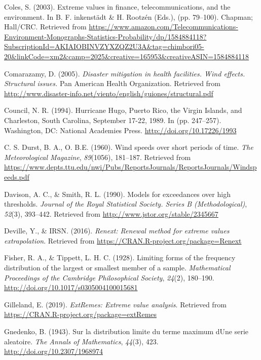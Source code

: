 \documentclass[12pt,oneside]{reedthesis}
\begin{document}
\leavevmode\hypertarget{ref-Coles2003}{}%
Coles, S. (2003). Extreme values in finance, telecommunications, and the environment. In B. F. inkenstädt \& H. Rootzén (Eds.), (pp. 79--100). Chapman; Hall/CRC. Retrieved from \url{https://www.amazon.com/Telecommunications-Environment-Monographs-Statistics-Probability/dp/1584884118?SubscriptionId=AKIAIOBINVZYXZQZ2U3A\&tag=chimbori05-20\&linkCode=xm2\&camp=2025\&creative=165953\&creativeASIN=1584884118}

\leavevmode\hypertarget{ref-windeffects}{}%
Comarazamy, D. (2005). \emph{Disaster mitigation in health facilities. Wind effects. Structural issues.} Pan American Health Organization. Retrieved from \url{http://www.disaster-info.net/viento/english/guiones/structural.pdf}

\leavevmode\hypertarget{ref-winddamage}{}%
Council, N. R. (1994). Hurricane Hugo, Puerto Rico, the Virgin Islands, and Charleston, South Carolina, September 17-22, 1989. In (pp. 247--257). Washington, DC: National Academies Press. \url{http://doi.org/10.17226/1993}

\leavevmode\hypertarget{ref-Durst1960}{}%
C. S. Durst, B. A., O. B.E. (1960). Wind speeds over short periods of time. \emph{The Meteorological Magazine}, \emph{89}(1056), 181--187. Retrieved from \url{https://www.depts.ttu.edu/nwi/Pubs/ReportsJournals/ReportsJournals/Windspeeds.pdf}

\leavevmode\hypertarget{ref-Davison1990}{}%
Davison, A. C., \& Smith, R. L. (1990). Models for exceedances over high thresholds. \emph{Journal of the Royal Statistical Society. Series B (Methodological)}, \emph{52}(3), 393--442. Retrieved from \url{http://www.jstor.org/stable/2345667}

\leavevmode\hypertarget{ref-Deville2016}{}%
Deville, Y., \& IRSN. (2016). \emph{Renext: Renewal method for extreme values extrapolation}. Retrieved from \url{https://CRAN.R-project.org/package=Renext}

\leavevmode\hypertarget{ref-Fisher1928}{}%
Fisher, R. A., \& Tippett, L. H. C. (1928). Limiting forms of the frequency distribution of the largest or smallest member of a sample. \emph{Mathematical Proceedings of the Cambridge Philosophical Society}, \emph{24}(2), 180--190. \url{http://doi.org/10.1017/s0305004100015681}

\leavevmode\hypertarget{ref-Gilleland2019}{}%
Gilleland, E. (2019). \emph{ExtRemes: Extreme value analysis}. Retrieved from \url{https://CRAN.R-project.org/package=extRemes}

\leavevmode\hypertarget{ref-Gnedenko1943}{}%
Gnedenko, B. (1943). Sur la distribution limite du terme maximum dUne serie aleatoire. \emph{The Annals of Mathematics}, \emph{44}(3), 423. \url{http://doi.org/10.2307/1968974}
\end{document}
